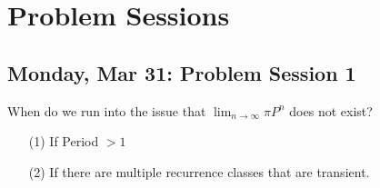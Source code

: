 \documentclass[10pt, oneside]{article}
\theoremstyle{definition}
\begin{document}
\newpage
\section{Problem Sessions}
\subsection{Monday, Mar 31: Problem Session 1}
When do we run into the issue that $\lim_{n\to \infty}\pi P^n$ does not exist? 
\begin{enumerate}
    \item[(1)] If Period $> 1$
    \item[(2)] If there are multiple recurrence classes that are transient.
\end{enumerate}
\end{document}
